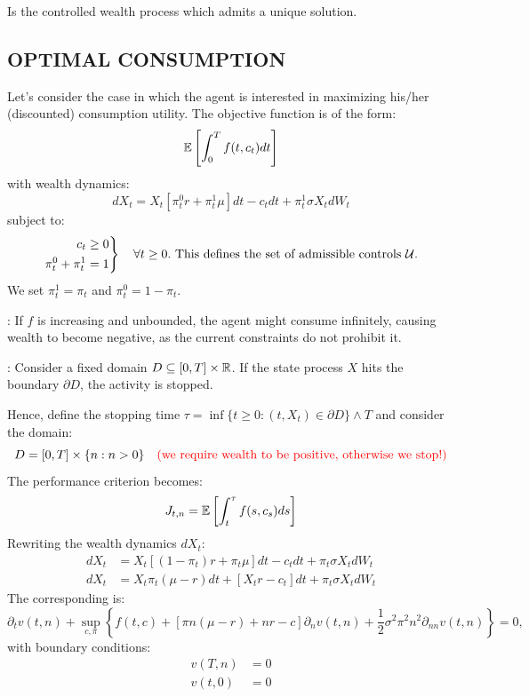Is the controlled wealth process which admits a unique solution.

\subsection*{\color{red}OPTIMAL CONSUMPTION}

Let's consider the case in which the agent is interested in maximizing his/her (discounted) consumption utility. The objective function is of the form:
\begin{equation*}
    \mathbb E \left[ \int_0^T f(t, c_t) dt \right]
\end{equation*}
with wealth dynamics:
\begin{equation*}
    dX_t = X_t \left[ \pi_t^0 r + \pi_t^1 \mu \right] dt - c_t dt + \pi_t^1 \sigma X_t dW_t
\end{equation*}
subject to:
\begin{equation*}
    \left. \begin{aligned} c_t &\geq 0 \\ \pi_t^0 + \pi_t^1 &= 1 \end{aligned} \right\} \quad \forall t \geq 0. \text{ This defines the set of admissible controls } \mathcal{U}.
\end{equation*}
We set $\pi_t^1 = \pi_t$ and $\pi_t^0 = 1 - \pi_t$.

: If $f$ is increasing and unbounded, the agent might consume infinitely, causing wealth to become negative, as the current constraints do not prohibit it.

: Consider a fixed domain $D \subseteq [0, T] \times \mathbb R$. If the state process $X$ hits the boundary $\partial D$, the activity is stopped.

Hence, define the stopping time $\tau = \inf \{ t \geq 0 : (t, X_t) \in \partial D \} \wedge T$ and consider the domain:
\begin{equation*}
    D = [0, T] \times \{ n : n > 0 \} \quad \text{\color{red}(we require wealth to be positive, otherwise we stop!)}
\end{equation*}
The performance criterion becomes:
\begin{equation*}
    J_{t,n} = \mathbb E \left[ \int_t^\tau f(s, c_s) ds \right]
\end{equation*}
Rewriting the wealth dynamics $dX_t$:
\begin{align*}
    dX_t &= X_t [(1 - \pi_t) r + \pi_t \mu] dt - c_t dt + \pi_t \sigma X_t dW_t \\
    dX_t &= X_t \pi_t (\mu - r) dt + [X_t r - c_t] dt + \pi_t \sigma X_t dW_t
\end{align*}
The corresponding  is:
\begin{equation*}
    \partial_t v(t,n) + \sup_{c, \pi} \left\{ f(t,c) + [\pi n (\mu - r) + nr - c] \partial_n v(t,n) + \frac{1}{2} \sigma^2 \pi^2 n^2 \partial_{nn} v(t,n) \right\} = 0,
\end{equation*}
with boundary conditions:
\begin{align*}
    v(T,n) &= 0 \\
    v(t,0) &= 0
\end{align*}

